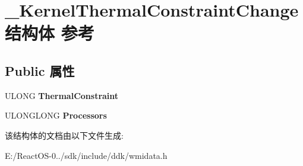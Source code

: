 \hypertarget{struct___kernel_thermal_constraint_change}{}\section{\+\_\+\+Kernel\+Thermal\+Constraint\+Change结构体 参考}
\label{struct___kernel_thermal_constraint_change}
\subsection*{Public 属性}
\begin{DoxyCompactItemize}
\item 
\mbox{\label{struct___kernel_thermal_constraint_change_a565c4a79e5c73d335c1c029d9d88911a}} 
U\+L\+O\+NG {\bfseries Thermal\+Constraint}
\item 
\mbox{\label{struct___kernel_thermal_constraint_change_a1120985240083aed6ecf36a84f44bd40}} 
U\+L\+O\+N\+G\+L\+O\+NG {\bfseries Processors}
\end{DoxyCompactItemize}


该结构体的文档由以下文件生成\+:\begin{DoxyCompactItemize}
\item 
E\+:/\+React\+O\+S-\/0../sdk/include/ddk/wmidata.\+h\end{DoxyCompactItemize}
